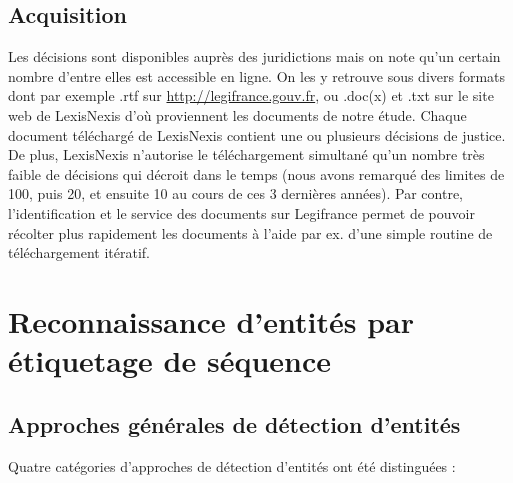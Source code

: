\subsection{Acquisition}
Les décisions sont disponibles auprès des juridictions mais on note qu'un certain nombre d'entre elles est accessible en ligne. On les y retrouve sous divers formats dont par exemple .rtf sur \url{http://legifrance.gouv.fr}, ou .doc(x) et .txt sur le site web de LexisNexis d'où proviennent les documents de notre étude. Chaque document téléchargé de LexisNexis contient une ou plusieurs décisions de justice. De plus, LexisNexis n'autorise le téléchargement simultané qu'un nombre très faible de décisions qui décroit dans le temps (nous avons remarqué des limites de 100, puis 20, et ensuite 10 au cours de ces 3 dernières années). Par contre, l'identification et le service des documents sur Legifrance permet de pouvoir récolter plus rapidement les documents à l'aide par ex. d'une simple routine de téléchargement itératif.




\section{Reconnaissance d'entités par étiquetage de séquence}
\label{sec:structuration:biblio}

\subsection{Approches générales de détection d'entités}

Quatre catégories d'approches de détection d'entités ont été distinguées \citep{chau2002nerwithNN}:


